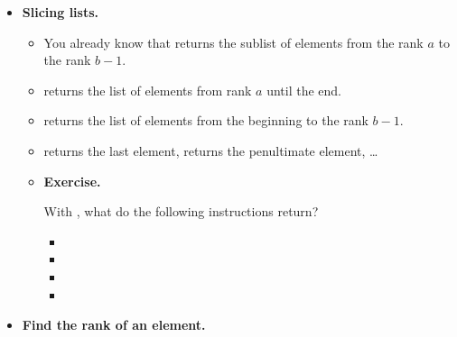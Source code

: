 \documentclass[11pt,class=report,crop=false]{standalone}
\begin{document}




\begin{cours}
\sauteligne
\begin{itemize}
  \item \textbf{Slicing lists.}
  

  \begin{itemize}
    \item You already know  that returns the sublist of elements from the rank $a$ to the rank $b-1$.
    
    \item {} returns the list of elements from rank $a$ until the end.
      
    \item {} returns the list of elements from the beginning to the rank $b-1$.
    
    \item {} returns the last element,  returns the penultimate element, \ldots

  \item \textbf{Exercise.} 
  
  With , 
what do the following instructions return?

\begin{itemize}
  \item {}
  \item {}
  \item {}
  \item {}
\end{itemize}

   \end{itemize} 
   
  \item \textbf{Find the rank of an element.} 


\end{itemize}
\end{cours}
\end{document}
